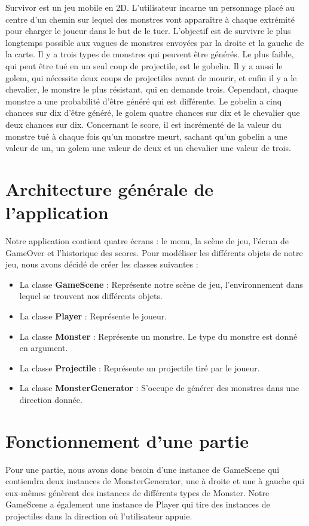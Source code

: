 \documentclass{article}
\begin{document}
Survivor est un jeu mobile en 2D. L’utilisateur incarne un personnage placé au centre d'un chemin sur lequel des monstres vont apparaître à chaque extrémité pour charger le joueur dans le but de le tuer. L’objectif est de survivre le plus longtemps possible aux vagues de monstres envoyées par la droite et la gauche de la carte. 
Il y a trois types de monstres qui peuvent être générés. Le plus faible, qui peut être tué en un seul coup de projectile, est le gobelin. Il y a aussi le golem, qui nécessite deux coups de projectiles avant de mourir, et enfin il y a le chevalier, le monstre le plus résistant, qui en demande trois.
Cependant, chaque monstre a une probabilité d'être généré qui est différente. Le gobelin a cinq chances sur dix d'être généré, le golem quatre chances sur dix et le chevalier que deux chances sur dix.
Concernant le score, il est incrémenté de la valeur du monstre tué à chaque fois qu'un monstre meurt, sachant qu'un gobelin a une valeur de un, un golem une valeur de deux et un chevalier une valeur de trois.

\section{Architecture générale de l'application}
\label{section:architecture}

Notre application contient quatre écrans : le menu, la scène de jeu, l'écran de GameOver et l'historique des scores.
Pour modéliser les différents objets de notre jeu, nous avons décidé de créer les classes suivantes :
\begin{itemize}
\item La classe \textbf{GameScene} : Représente notre scène de jeu, l'environnement dans lequel se trouvent nos différents objets.
\item La classe \textbf{Player} : Représente le joueur.
\item La classe \textbf{Monster} : Représente un monstre. Le type du monstre est donné en argument.
\item La classe \textbf{Projectile} : Représente un projectile tiré par le joueur.
\item La classe \textbf{MonsterGenerator} : S'occupe de générer des monstres dans une direction donnée.
\end{itemize}

\section{Fonctionnement d'une partie}
Pour une partie, nous avons donc besoin d'une instance de GameScene qui contiendra deux instances de MonsterGenerator, une à droite et une à gauche qui eux-mêmes génèrent des instances de différents types de Monster.
Notre GameScene a également une instance de Player qui tire des instances de projectiles dans la direction où l'utilisateur appuie.
\end{document}
